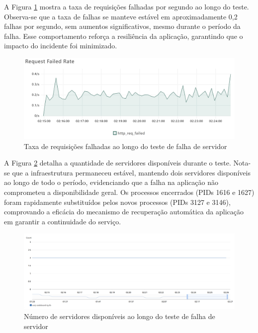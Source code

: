 A Figura \ref{fig:process-failing-req-failed-rate} mostra a taxa de requisições falhadas por segundo ao longo do teste. Observa-se que a taxa de falhas se manteve estável em aproximadamente 0,2 falhas por segundo, sem aumentos significativos, mesmo durante o período da falha. Esse comportamento reforça a resiliência da aplicação, garantindo que o impacto do incidente foi minimizado.

\begin{figure}[H]
    \centering
    \includegraphics[width=1\textwidth]{assets/process-failing-test/req-failed-rate.png}
    \caption{Taxa de requisições falhadas ao longo do teste de falha de servidor}
    \label{fig:process-failing-req-failed-rate}
\end{figure}

A Figura \ref{fig:process-failing-healthy-hosts} detalha a quantidade de servidores disponíveis durante o teste. Nota-se que a infraestrutura permaneceu estável, mantendo dois servidores disponíveis ao longo de todo o período, evidenciando que a falha na aplicação não comprometeu a disponibilidade geral. Os processos encerrados (PIDs 1616 e 1627) foram rapidamente substituídos pelos novos processos (PIDs 3127 e 3146), comprovando a eficácia do mecanismo de recuperação automática da aplicação em garantir a continuidade do serviço.

\begin{figure}[H]
    \centering
    \includegraphics[width=1\textwidth]{assets/process-failing-test/healthy-hosts.png}
    \caption{Número de servidores disponíveis ao longo do teste de falha de servidor}
    \label{fig:process-failing-healthy-hosts}
\end{figure}


